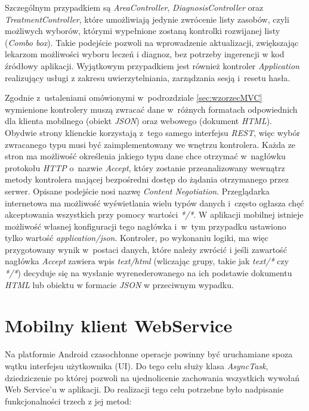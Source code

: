 \documentclass[11pt]{aghdpl}
\begin{document}
Szczególnym przypadkiem są \emph{AreaController}, \emph{DiagnosisController} oraz \emph{TreatmentController}, które umożliwiają jedynie zwrócenie listy zasobów, czyli możliwych wyborów, którymi wypełnione zostaną kontrolki rozwijanej listy (\emph{Combo box}). Takie podejście pozwoli na wprowadzenie aktualizacji, zwiększając lekarzom możliwości wyboru leczeń i diagnoz, bez potrzeby ingerencji w kod źródłowy aplikacji. Wyjątkowym przypadkiem jest również kontroler \emph{Application} realizujący usługi z zakresu uwierzytelniania, zarządzania sesją i~resetu hasła.

Zgodnie z~ustaleniami omówionymi w~podrozdziale \ref{sec:wzorzecMVC} wymienione kontrolery muszą zwracać dane w~różnych formatach odpowiednich dla klienta mobilnego (obiekt \emph{JSON}) oraz webowego (dokument \emph{HTML}). Obydwie strony klienckie korzystają z~tego samego interfejsu \emph{REST}, więc wybór zwracanego typu musi być zaimplementowany we wnętrzu kontrolera. Każda ze stron ma możliwość określenia jakiego typu dane chce otrzymać w~nagłówku protokołu \emph{HTTP} o~nazwie \emph{Accept}, który zostanie przeanalizowany wewnątrz metody kontrolera mającej bezpośredni dostęp do żądania otrzymanego przez serwer. Opisane podejście nosi nazwę \emph{Content Negotiation}. Przeglądarka internetowa ma możliwość wyświetlania wielu typów danych i~często ogłasza chęć akceptowania wszystkich przy pomocy wartości \emph{*/*}. W aplikacji mobilnej istnieje możliwość własnej konfiguracji tego nagłówka i~w~tym przypadku ustawiono tylko wartość \emph{application/json}. Kontroler, po wykonaniu logiki, ma więc przygotowany wynik w~postaci danych, które należy zwrócić i jeśli zawartość nagłówka \emph{Accept} zawiera wpis \emph{text/html} (wliczając grupy, takie jak \emph{text/*} czy \emph{*/*}) decyduje się na wysłanie wyrenederowanego na ich podstawie dokumentu \emph{HTML} lub obiektu w formacie \emph{JSON} w przeciwnym wypadku.

\section{Mobilny klient WebService}

Na platformie Android czasochłonne operacje powinny być uruchamiane spoza wątku interfejsu użytkownika (UI). Do tego celu służy klasa \emph{AsyncTask}, dziedziczenie po której pozwoli na ujednolicenie zachowania wszystkich wywołań Web Service'u w aplikacji. Do realizacji tego celu potrzebne było nadpisanie funkcjonalności trzech z jej metod:
\end{document}
